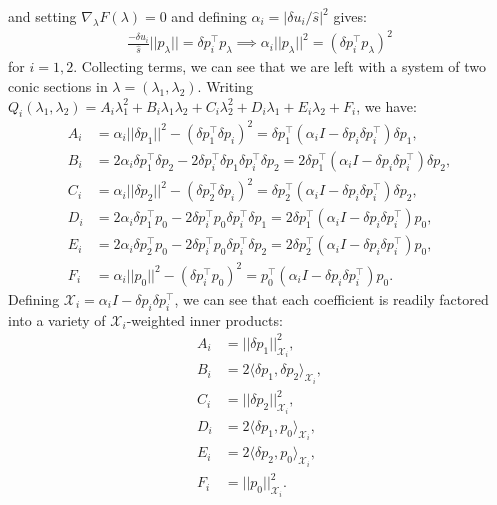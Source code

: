\documentclass{article}
\begin{document}
and setting $\nabla_\lambda F(\lambda) = 0$ and defining
$\alpha_i = |\delta u_i/\hat{s}|^2$ gives:
\begin{align*}
  \frac{-\delta u_i}{\hat{s}} ||p_\lambda|| = \delta p_i^\top p_\lambda \implies \alpha_i ||p_\lambda||^2 = {(\delta p_i^\top p_\lambda)}^2
\end{align*}
for $i = 1, 2$. Collecting terms, we can see that we are left with a
system of two conic sections in $\lambda = (\lambda_1,
\lambda_2)$. Writing
$Q_i(\lambda_1, \lambda_2) = A_i \lambda_1^2 + B_i \lambda_1 \lambda_2 + C_i \lambda_2^2 + D_i
\lambda_1 + E_i \lambda_2 + F_i$, we have:
\begin{align*}
  A_i &= \alpha_i ||\delta p_1||^2 - {(\delta p_1^\top \delta p_i)}^2 = \delta p_1^\top {(\alpha_i I - \delta p_i \delta p_i^\top)} \delta p_1, \\
  B_i &= 2 \alpha_i \delta p_1^\top \delta p_2 - 2 \delta p_i^\top \delta p_1 \delta p_i^\top \delta p_2 = 2 \delta p_1^\top {(\alpha_i I - \delta p_i \delta p_i^\top)} \delta p_2, \\
  C_i &= \alpha_i ||\delta p_2||^2 - {(\delta p_2^\top \delta p_i)}^2 = \delta p_2^\top {(\alpha_i I - \delta p_i \delta p_i^\top)} \delta p_2, \\
  D_i &= 2 \alpha_i \delta p_1^\top p_0 - 2 \delta p_i^\top p_0 \delta p_i^\top \delta p_1 = 2 \delta p_1^\top {(\alpha_i I - \delta p_i \delta p_i^\top)} p_0, \\
  E_i &= 2 \alpha_i \delta p_2^\top p_0 - 2 \delta p_i^\top p_0 \delta p_i^\top \delta p_2 = 2 \delta p_2^\top {(\alpha_i I - \delta p_i \delta p_i^\top)} p_0, \\
  F_i &= \alpha_i ||p_0||^2 - {(\delta p_i^\top p_0)}^2 = p_0^\top {(\alpha_i I - \delta p_i \delta p_i^\top)} p_0.
\end{align*}
Defining $\mathcal{X}_i = \alpha_i I - \delta p_i \delta p_i^\top$, we
can see that each coefficient is readily factored into a variety of
$\mathcal{X}_i$-weighted inner products:
\begin{align*}
  A_i &= ||\delta p_1||_{\mathcal{X}_i}^2, \\
  B_i &= 2 \langle \delta p_1, \delta p_2 \rangle_{\mathcal{X}_i}, \\
  C_i &= ||\delta p_2||_{\mathcal{X}_i}^2, \\
  D_i &= 2 \langle \delta p_1, p_0 \rangle_{\mathcal{X}_i}, \\
  E_i &= 2 \langle \delta p_2, p_0 \rangle_{\mathcal{X}_i}, \\
  F_i &= ||p_0||_{\mathcal{X}_i}^2.
\end{align*}
\end{document}
